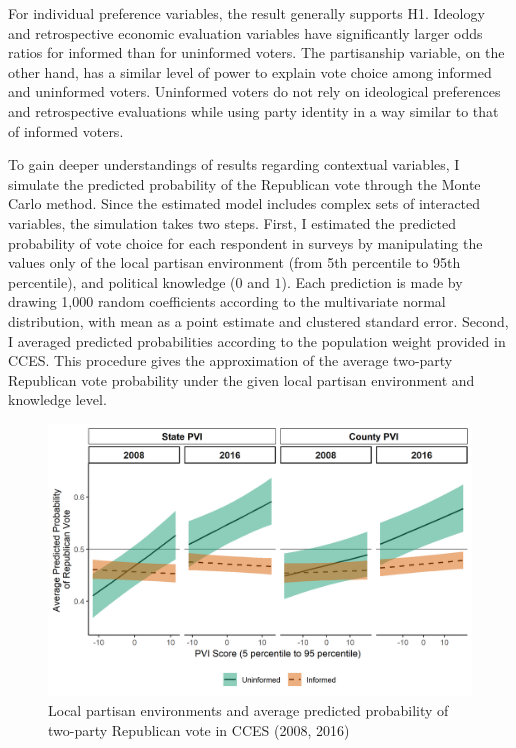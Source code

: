 \documentclass[letterpaper, 12pt]{article}
\begin{document}
    \par For individual preference variables, the result generally supports H1. Ideology and retrospective economic evaluation variables have significantly larger odds ratios for informed than for uninformed voters. The partisanship variable, on the other hand, has a similar level of power to explain vote choice among informed and uninformed voters. Uninformed voters do not rely on ideological preferences and retrospective evaluations while using party identity in a way similar to that of informed voters.
    
    \par To gain deeper understandings of results regarding contextual variables, I simulate the predicted probability of the Republican vote through the Monte Carlo method. Since the estimated model includes complex sets of interacted variables, the simulation takes two steps. First, I estimated the predicted probability of vote choice for each respondent in surveys by manipulating the values only of the local partisan environment (from 5th percentile to 95th percentile), and political knowledge ($0$ and $1$). Each prediction is made by drawing 1,000 random coefficients according to the multivariate normal distribution, with mean as a point estimate and clustered standard error. Second, I averaged predicted probabilities according to the population weight provided in CCES. This procedure gives the approximation of the average two-party Republican vote probability under the given local partisan environment and knowledge level.

    \begin{figure}[t!]
        \caption{Local partisan environments and average predicted probability of two-party Republican vote in CCES (2008, 2016)}
        \label{fig:ccespredplot}
        \includegraphics[width=\linewidth]{../outputs/ccespredplot.png}
    \end{figure}
        
\end{document}
